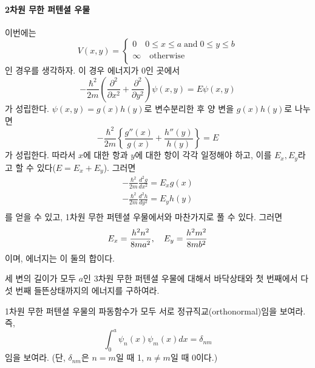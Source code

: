 \paragraph{2차원 무한 퍼텐셜 우물}
이번에는 
\begin{equation}
V(x,y)=\begin{cases}
0\quad 0\le x\le a \;\mathrm{and}\; 0\le y\le b\\
\infty\quad \mathrm{otherwise}\\
\end{cases}
\end{equation}
인 경우를 생각하자. 이 경우 에너지가 0인 곳에서
\begin{equation}
-\frac{\hbar^2}{2m}\left (\frac{\partial^2}{\partial x^2}+\frac{\partial^2}{\partial y^2}\right)\psi(x,y)=E\psi(x,y)
\end{equation}
가 성립한다. $\psi(x,y)=g(x)h(y)$로 변수분리한 후 양 변을 $g(x)h(y)$로 나누면
\begin{equation}
-\frac{\hbar^2}{2m}\left \{ \frac{g''(x)}{g(x)}+\frac{h''(y)}{h(y)}\right\}=E
\end{equation}
가 성립한다. 따라서 $x$에 대한 항과 $y$에 대한 항이 각각 일정해야 하고, 이를 $E_x, E_y$라고 할 수 있다($E=E_x+E_y$). 그러면
\begin{align}
-\frac{\hbar^2}{2m}\frac{d^2 g}{d x^2}=E_xg(x)\\
-\frac{\hbar^2}{2m}\frac{d^2 h}{d y^2}=E_yh(y)\\
\end{align}
를 얻을 수 있고, 1차원 무한 퍼텐셜 우물에서와 마찬가지로 풀 수 있다. 그러면 
\begin{equation}
E_x=\frac{h^2n^2}{8ma^2},\quad E_y=\frac{h^2m^2}{8mb^2}\\
\end{equation}
이며, 에너지는 이 둘의 합이다.

\begin{exercise}
세 변의 길이가 모두 $a$인 3차원 무한 퍼텐셜 우물에 대해서 바닥상태와 첫 번째에서 다섯 번째 들뜬상태까지의 에너지를 구하여라. 
\end{exercise}

\begin{exercise}
1차원 무한 퍼텐셜 우물의 파동함수가 모두 서로 정규직교(orthonormal)임을 보여라. 즉, 
\begin{equation}
\int_0^a \psi_n(x)\psi_m(x) dx = \delta_{nm}
\end{equation}
임을 보여라. (단, $\delta_{nm}$은 $n=m$일 때 1, $n\ne m$일 때 0이다.)
\end{exercise}

